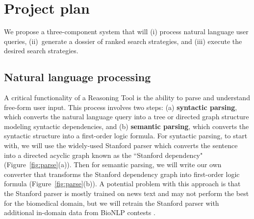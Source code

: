 \documentclass[11pt,notitlepage]{article}
\begin{document}

\section{Project plan}
We propose a three-component system that will (i) process natural language user
queries, (ii)~generate a dossier of ranked search strategies, and (iii) execute
the desired search strategies.
\subsection{Natural language processing}
\label{section:NLP}
A critical functionality of a Reasoning Tool is the ability to parse and
understand free-form user input. This process involves two steps: (a) {\bf
  syntactic parsing}, which converts the natural language query into a tree or
directed graph structure modeling syntactic dependencies, and (b) {\bf semantic
  parsing}, which converts the syntactic structure into a first-order logic
formula.  For syntactic parsing, to start with, we will use the widely-used
Stanford parser %
which converts the sentence into a directed acyclic graph known as the
``Stanford dependency" \cite{stanforddep:2008} (Figure~\ref{fig:parse}(a)).
Then for semantic parsing, we will write our own converter that transforms the
Stanford dependency graph into first-order logic formula
(Figure~\ref{fig:parse}(b)).  A potential problem with this approach is that the
Stanford parser is mostly trained on news text and may not perform the best for
the biomedical domain, but we will retrain the Stanford parser with additional
in-domain data from BioNLP contests \cite{bionlp:2013}.
\end{document}
